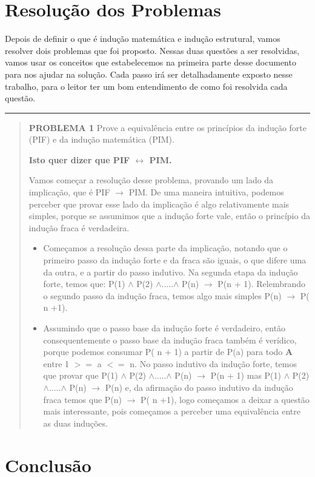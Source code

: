 \documentclass[a4paper, 10pt]{article}
\begin{document}
\section{Resolução dos Problemas}
Depois de definir o que é indução matemática e indução estrutural, vamos resolver dois problemas que foi proposto. Nessas duas questões a ser resolvidas, vamos usar os conceitos que estabelecemos na primeira parte desse documento para nos ajudar na solução. Cada passo irá ser detalhadamente exposto nesse trabalho, para o leitor ter um bom entendimento de como foi resolvida cada questão.
\hrule
\begin{quote}
        \textbf{PROBLEMA 1}
        Prove a equivalência entre os princípios da indução forte (PIF) e da indução matemática (PIM).
        
        \textbf{Isto quer dizer que PIF $\leftrightarrow$ PIM.}
       
       
        Vamos começar a resolução desse problema, provando um lado da implicação, que é PIF $\to$ PIM. De uma maneira intuitiva, podemos perceber que provar esse lado da implicação é algo relativamente mais simples, porque se assumimos que a indução forte vale, então o princípio da indução fraca é verdadeira.
        \begin{itemize}
            \item Começamos a resolução dessa parte da implicação, notando que o primeiro passo da indução forte e da fraca são iguais, o que difere uma da outra, e a partir do passo indutivo. Na segunda etapa da indução forte, temos que: P(1) $\wedge$ P(2) $\wedge$.....$\wedge$ P(n) $\to$ P(n + 1). Relembrando o segundo passo da indução fraca, temos algo mais simples P(n) $\to$ P( n +1).
            
            \item Assumindo que o passo base da indução forte é verdadeiro, então consequentemente o passo base da indução fraca também é verídico, porque podemos consumar P( n + 1) a partir de P(a) para todo \textbf{A} entre 1 $>=$ a $<=$ n. No passo indutivo da indução forte, temos que provar que P(1) $\wedge$ P(2) $\wedge$.....$\wedge$ P(n) $\to$ P(n + 1) mas P(1) $\wedge$ P(2) $\wedge$.....$\wedge$ P(n) $\to$ P(n) e, da afirmação do passo indutivo da indução fraca temos que  P(n) $\to$ P( n +1), logo começamos a deixar a questão mais interessante, pois começamos a perceber uma equivalência entre as duas induções.
        \end{itemize}
    \end{quote}


\section{Conclusão}
\end{document}
